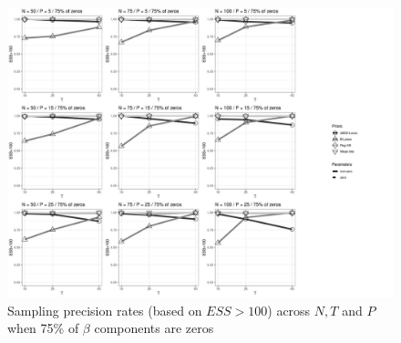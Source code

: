 \documentclass[a4paper,12pt]{article}
\begin{document}

\begin{figure}[h]
\centering 
\includegraphics[width=18cm]{Prec100_nz25_beta.jpg}
\caption{Sampling precision rates (based on $ESS>100$) across $N, T$ and $P$ when 75\% of $\beta$ components are zeros}
\label{fig:Prec100_nz25}
\end{figure}
\end{document}
